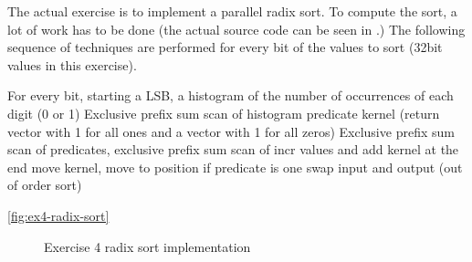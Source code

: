 The actual exercise is to implement a parallel radix sort.
To compute the sort, a lot of work has to be done (the actual source code can be seen in \cite{exercises}.)
The following sequence of techniques are performed for every bit of the values to sort (32bit values in this exercise).


For every bit, starting a LSB, a histogram of the number of occurrences of each digit (0 or 1)
Exclusive prefix sum scan of histogram
predicate kernel (return vector with 1 for all ones and a vector with 1 for all zeros)
Exclusive prefix sum scan of predicates, exclusive prefix sum scan of incr values and add kernel at the end
move kernel, move to position if predicate is one
swap input and output (out of order sort)

\autoref{fig:ex4-radix-sort}

\begin{figure}[ht]
	\centering
	\caption{Exercise 4 radix sort implementation}
	\label{fig:ex4-radix-sort}
\end{figure}








